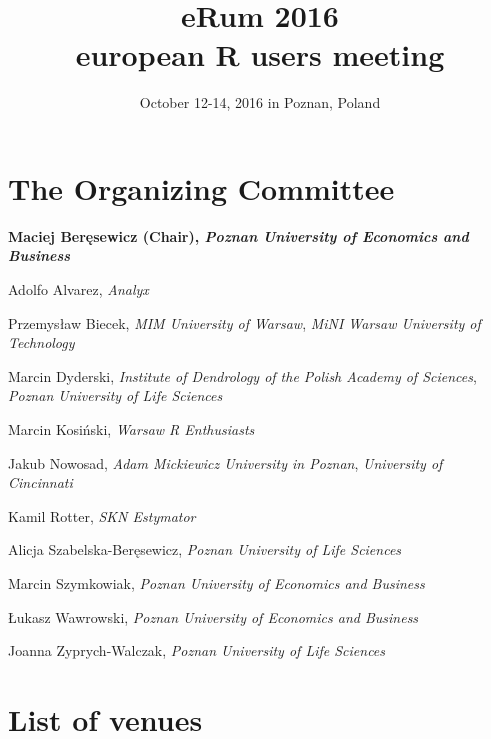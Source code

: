 \documentclass[11pt,twoside,b5paper]{book}
\title{eRum 2016 \\ european R users meeting}
\author{October 12-14, 2016 in Poznan, Poland}
\date{}
\begin{document}


\clearpage

\frontmatter
\maketitle

\chapter{The Organizing Committee}

\textbf{Maciej Beręsewicz (Chair), \textit{Poznan University of Economics and Business}}

Adolfo Alvarez, \textit{Analyx}

Przemysław Biecek, \textit{MIM University of Warsaw}, \textit{MiNI Warsaw University of Technology}

Marcin Dyderski, \textit{Institute of Dendrology of the Polish Academy of Sciences}, \textit{Poznan University of Life Sciences}

Marcin Kosiński, \textit{Warsaw R Enthusiasts}

Jakub Nowosad, \textit{Adam Mickiewicz University in Poznan}, \textit{University of Cincinnati}

Kamil Rotter, \textit{SKN Estymator}

Alicja Szabelska-Beręsewicz, \textit{Poznan University of Life Sciences}

Marcin Szymkowiak, \textit{Poznan University of Economics and Business}

Łukasz Wawrowski, \textit{Poznan University of Economics and Business}

Joanna Zyprych-Walczak, \textit{Poznan University of Life Sciences}

\chapter{List of venues}

\end{document}
